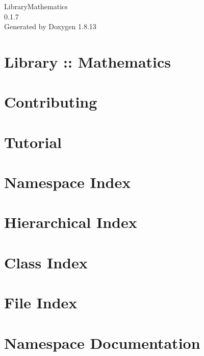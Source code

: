 \documentclass[twoside]{book}
\newcommand{\+}{\discretionary{\mbox{\scriptsize$\hookleftarrow$}}{}{}}
\newcommand{\clearemptydoublepage}{%
  \newpage{\pagestyle{empty}\cleardoublepage}%
}
\begin{document}
\hypersetup{pageanchor=false,
             bookmarksnumbered=true,
             pdfencoding=unicode
            }
\begin{titlepage}
\vspace*{7cm}
\begin{center}%
{\Large Library\+Mathematics \\[1ex]\large 0.\+1.\+7 }\\
\vspace*{1cm}
{\large Generated by Doxygen 1.8.13}\\
\end{center}
\end{titlepage}
\clearemptydoublepage
{}
\tableofcontents
\clearemptydoublepage
{}
\hypersetup{pageanchor=true}

\chapter{Library \+:\+: Mathematics}
\label{index}\hypertarget{index}{}
\chapter{Contributing}
\label{md__c_o_n_t_r_i_b_u_t_i_n_g}

\chapter{Tutorial}
\label{md_docs__tutorial}

\chapter{Namespace Index}

\chapter{Hierarchical Index}

\chapter{Class Index}

\chapter{File Index}

\chapter{Namespace Documentation}










\end{document}
